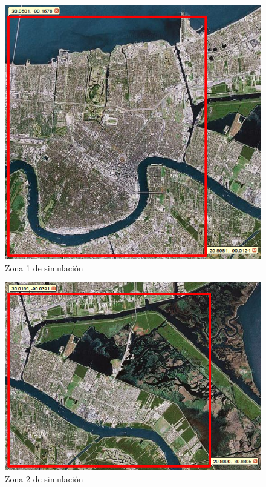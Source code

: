 \begin{figure}[H]
 \centering
 \includegraphics[width=120mm]{figuras/cap6/NOarea2.png}
 \caption{Zona 1 de simulación} \label{zona1}
\end{figure}

\begin{figure}[H]
 \centering
 \includegraphics[width=125mm]{figuras/cap6/NOarea3.png}
 \caption{Zona 2 de simulación} \label{zona2}
\end{figure}

